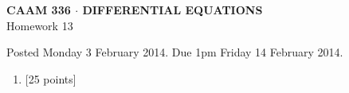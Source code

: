 \documentclass[10pt]{article}
\begin{document}
\vspace*{-5em}
\begin{center}
\large \textsf{\textbf{CAAM 336 $\cdot$ DIFFERENTIAL EQUATIONS}\\[0.5em]
Homework 13 }
\end{center}

Posted Monday 3 February 2014. Due 1pm Friday 14 February 2014.

\begin{enumerate}\addtocounter{enumi}{12}
\item {[25 points]}\\  

\end{enumerate}
\end{document}
